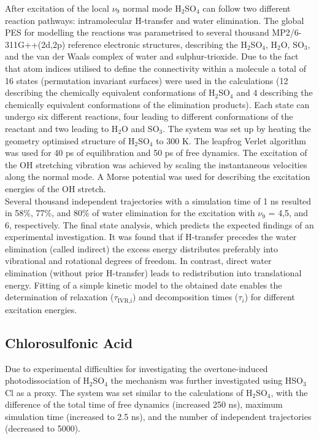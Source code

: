 \documentclass[journal=jacsat,manuscript=article]{achemso}
\begin{document}
\noindent
After excitation of the local $\nu_9$ normal mode H$_2$SO$_4$ can
follow two different reaction pathways: intramolecular H-transfer and
water elimination. The global PES for modelling the reactions was
parametrised to several thousand MP2/6-311G++(2d,2p) reference
electronic structures, describing the H$_2$SO$_4$, H$_2$O, SO$_3$, and
the van der Waals complex of water and sulphur-trioxide. Due to the
fact that atom indices utilised to define the connectivity within a
molecule a total of 16 states (permutation invariant surfaces) were
used in the calculations (12 describing the chemically equivalent
conformations of H$_2$SO$_4$ and 4 describing the chemically
equivalent conformations of the elimination products). Each state can
undergo six different reactions, four leading to different
conformations of the reactant and two leading to H$_2$O and
SO$_3$. The system was set up by heating the geometry optimised
structure of H$_2$SO$_4$ to 300 K. The leapfrog Verlet algorithm was
used for 40 ps of equilibration and 50 ps of free dynamics. The
excitation of the OH stretching vibration was achieved by scaling the
instantaneous velocities along the normal mode. A Morse potential was
used for describing the excitation energies of the OH stretch.\\

\noindent
Several thousand independent trajectories with a simulation time of 1
ns resulted in 58\%, 77\%, and 80\% of water elimination for the
excitation with $\nu_9$ = 4,5, and 6, respectively. The final state
analysis, which predicts the expected findings of an experimental
investigation. It was found that if H-transfer precedes the water
elimination (called indirect) the excess energy distributes preferably
into vibrational and rotational degrees of freedom. In contrast,
direct water elimination (without prior H-transfer) leads to
redistribution into translational energy. Fitting of a simple kinetic
model to the obtained date enables the determination of relaxation
($\tau_{\text{IVR,i}}$) and decomposition times ($\tau_i$) for
different excitation energies.\\

\subsection{Chlorosulfonic Acid}

\noindent
Due to experimental difficulties for investigating the
overtone-induced photodissociation of
H$_2$SO$_4$\cite{lane.jpca.2007.vibphotodis,gupta.pccp.2010.vibphotodis,lane.kjaergaard.jpca.2007.vibphotodis}
the mechanism was further investigated using HSO$_3$Cl as a
proxy\cite{lane.kjaergaard.jpca.2007.vibphotodis,gupta.pccp.2010.vibphotodis,reyesbrickel.pccp.2016.msarmd}. The
system was set similar to the calculations of H$_2$SO$_4$, with the
difference of the total time of free dynamics (increased 250 ns),
maximum simulation time (increased to 2.5 ns), and the number of
independent trajectories (decreased to 5000).\\
\end{document}
